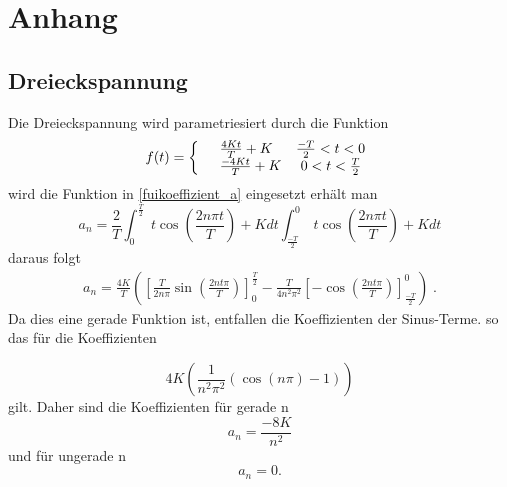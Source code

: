 \section{Anhang}
\label{Anhang}
\subsection{Dreieckspannung}
\label{sec:Dreieckspannung}
Die Dreieckspannung wird parametriesiert durch die Funktion
\begin{equation*}
  f(t)=\left\{
  \begin{array}{l l}
    &\frac{4Kt}{T}+K   \;\;\;\;\;\;\frac{-T}{2}<t<0 \\
    &\frac{-4Kt}{T}+K  \;\;\;\;\;0<t<\frac{T}{2}
  \end{array}
  \right.
\end{equation*}
wird die Funktion in \eqref{fuikoeffizient_a} eingesetzt erhält man
\begin{equation*}
  a_n=\frac{2}{T}\int^{\frac{T}{2}}_0 \;t \cos\left(\frac{2n \pi t}{T} \right) + K dt
  \int^0_{\frac{-T}{2}} \; t \cos\left(\frac{2n\pi t}{T} \right) + K dt
\end{equation*}
daraus folgt
\begin{align*}
  a_n=\frac{4K}{T}\left(\left[ \frac{T}{2n\pi}\sin(\frac{2nt\pi}{T})\right]
  ^\frac{T}{2}_0-\frac{T}{4n^2\pi^2}\left[-\cos\left(\frac{2nt\pi}{T}\right)
  \right]^0_\frac{-T}{2} \right)\;.
\end{align*}
Da dies eine gerade Funktion ist, entfallen die Koeffizienten der Sinus-Terme.
so das für die Koeffizienten

\begin{equation}
  4K\left(\frac{1}{n^2\pi^2}(\cos(n\pi)-1)\right)
\end{equation}
gilt. Daher sind die Koeffizienten für gerade n
\begin{equation*}
a_n=\frac{-8K}{n^2}
\end{equation*}
und für ungerade n
\begin{equation*}
  a_n=0.
\end{equation*}
